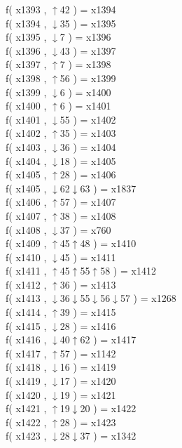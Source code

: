f( x1393 , $\uparrow$42 ) = x1394 \\
f( x1394 , $\downarrow$35 ) = x1395 \\
f( x1395 , $\downarrow$7 ) = x1396 \\
f( x1396 , $\downarrow$43 ) = x1397 \\
f( x1397 , $\uparrow$7 ) = x1398 \\
f( x1398 , $\uparrow$56 ) = x1399 \\
f( x1399 , $\downarrow$6 ) = x1400 \\
f( x1400 , $\uparrow$6 ) = x1401 \\
f( x1401 , $\downarrow$55 ) = x1402 \\
f( x1402 , $\uparrow$35 ) = x1403 \\
f( x1403 , $\downarrow$36 ) = x1404 \\
f( x1404 , $\downarrow$18 ) = x1405 \\
f( x1405 , $\uparrow$28 ) = x1406 \\
f( x1405 , $\downarrow$62$\downarrow$63 ) = x1837 \\
f( x1406 , $\uparrow$57 ) = x1407 \\
f( x1407 , $\uparrow$38 ) = x1408 \\
f( x1408 , $\downarrow$37 ) = x760 \\
f( x1409 , $\uparrow$45$\uparrow$48 ) = x1410 \\
f( x1410 , $\downarrow$45 ) = x1411 \\
f( x1411 , $\uparrow$45$\uparrow$55$\uparrow$58 ) = x1412 \\
f( x1412 , $\uparrow$36 ) = x1413 \\
f( x1413 , $\downarrow$36$\downarrow$55$\downarrow$56$\downarrow$57 ) = x1268 \\
f( x1414 , $\uparrow$39 ) = x1415 \\
f( x1415 , $\downarrow$28 ) = x1416 \\
f( x1416 , $\downarrow$40$\uparrow$62 ) = x1417 \\
f( x1417 , $\uparrow$57 ) = x1142 \\
f( x1418 , $\downarrow$16 ) = x1419 \\
f( x1419 , $\downarrow$17 ) = x1420 \\
f( x1420 , $\downarrow$19 ) = x1421 \\
f( x1421 , $\uparrow$19$\downarrow$20 ) = x1422 \\
f( x1422 , $\uparrow$28 ) = x1423 \\
f( x1423 , $\downarrow$28$\downarrow$37 ) = x1342 \\
